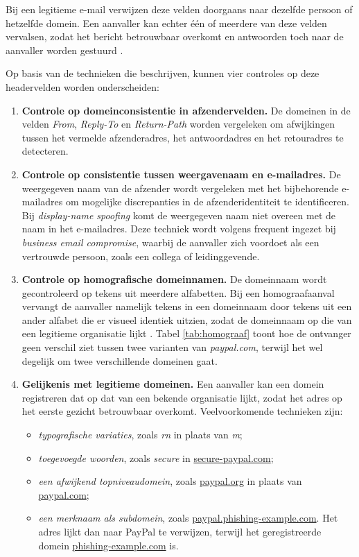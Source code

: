 Bij een legitieme e-mail verwijzen deze velden doorgaans naar dezelfde persoon of hetzelfde domein. Een aanvaller kan echter één of meerdere van deze velden vervalsen, zodat het bericht betrouwbaar overkomt en antwoorden toch naar de aanvaller worden gestuurd \autocite{Hu2018}.

Op basis van de technieken die \textcite{Veit2025} beschrijven, kunnen vier controles op deze headervelden worden onderscheiden:
\begin{enumerate}
    \item \textbf{Controle op domeinconsistentie in afzendervelden.} De domeinen in de velden \emph{From}, \emph{Reply-To} en \emph{Return-Path} worden vergeleken om afwijkingen tussen het vermelde afzenderadres, het antwoordadres en het retouradres te detecteren.
    \item \textbf{Controle op consistentie tussen weergavenaam en e-mailadres.} De weergegeven naam van de afzender wordt vergeleken met het bijbehorende e-mailadres om mogelijke discrepanties in de afzenderidentiteit te identificeren. Bij \emph{display-name spoofing} komt de weergegeven naam niet overeen met de naam in het e-mailadres. Deze techniek wordt volgens \textcite{Cidon2019} frequent ingezet bij \emph{business email compromise}, waarbij de aanvaller zich voordoet als een vertrouwde persoon, zoals een collega of leidinggevende.
    \item \textbf{Controle op homografische domeinnamen.} De domeinnaam wordt gecontroleerd op tekens uit meerdere alfabetten. Bij een homograafaanval vervangt de aanvaller namelijk tekens in een domeinnaam door tekens uit een ander alfabet die er visueel identiek uitzien, zodat de domeinnaam op die van een legitieme organisatie lijkt \autocite{Sawabe2019}. Tabel \ref{tab:homograaf} toont hoe de ontvanger geen verschil ziet tussen twee varianten van \emph{paypal.com}, terwijl het wel degelijk om twee verschillende domeinen gaat.
    \item \textbf{Gelijkenis met legitieme domeinen.} Een aanvaller kan een domein registreren dat op dat van een bekende organisatie lijkt, zodat het adres op het eerste gezicht betrouwbaar overkomt. Veelvoorkomende technieken zijn:
        \begin{itemize}
        \item \emph{typografische variaties}, zoals \emph{rn} in plaats van \emph{m};
        \item \emph{toegevoegde woorden}, zoals \emph{secure} in \url{secure-paypal.com};
        \item \emph{een afwijkend topniveaudomein}, zoals \url{paypal.org} in plaats van \url{paypal.com};
        \item \emph{een merknaam als subdomein}, zoals \url{paypal.phishing-example.com}. Het adres lijkt dan naar PayPal te verwijzen, terwijl het geregistreerde domein \url{phishing-example.com} is.
        \end{itemize}
\end{enumerate}

